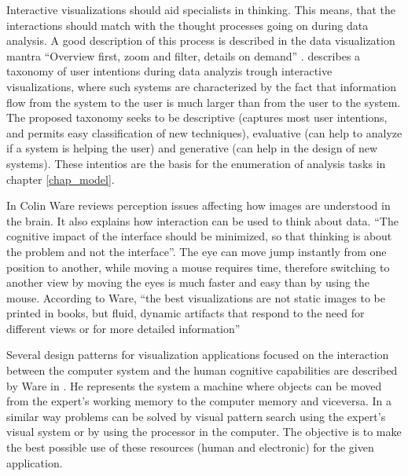 Interactive visualizations should aid specialists in thinking. This means, that the interactions should match with the thought processes going on during data analysis. A good description of this process is described in the data visualization mantra ``Overview first, zoom and filter, details on demand'' \autocite{schneiderman_designing_1998}. \autocite{yi_toward_2007} describes a taxonomy of user intentions during data analyzis trough interactive visualizations, where such systems are characterized by the fact that information flow from the system to the user is much larger than from the user to the system. The proposed taxonomy seeks to be descriptive (captures most user intentions, and permits easy classification of new techniques), evaluative (can help to analyze if a system is helping the user) and generative (can help in the design of new systems). These intentios are the basis for the enumeration of analysis tasks in chapter \ref{chap_model}.

In \autocite{ware_information_2004} Colin Ware reviews perception issues affecting how images are understood in the brain. It also explains how interaction can be used to think about data.  ``The cognitive impact of the interface should be minimized, so that thinking is about the problem and not the interface''. The eye can move jump instantly from one position to another, while moving a mouse requires time, therefore switching to another view by moving the eyes is much faster and easy than by using the mouse. According to Ware, ``the best visualizations are not static images to be printed in books, but fluid, dynamic artifacts that respond to the need for different views or for more detailed information''

Several design patterns for visualization applications focused on the interaction between the computer system and the human cognitive capabilities are described by Ware in \autocite{ware_visual_2013}. He represents the system a machine where objects can be moved from the expert's working memory to the computer memory and viceversa. In a similar way problems can be solved by visual pattern search using the expert's visual system or by using the processor in the computer. The objective is to make the best possible use of these resources (human and electronic) for the given application. 


